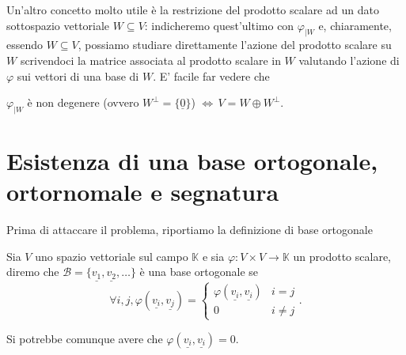 Un'altro concetto molto utile è la restrizione del prodotto scalare ad un dato sottospazio vettoriale $W \subseteq V$: indicheremo quest'ultimo con $\varphi_{|W}$ e, chiaramente, essendo $W \subseteq V$, possiamo studiare direttamente l'azione del prodotto scalare su $W$ scrivendoci la matrice associata al prodotto scalare in $W$ valutando l'azione di $\varphi$ sui vettori di una base di $W$. E' facile far vedere che
\begin{exercise} \label{ex:3.4}
	$\varphi_{|W}$ è non degenere (ovvero $W^\perp = \{ \underline{0} \}$) $\iff \, V = W \oplus W^\perp$.
\end{exercise}

\section{Esistenza di una base ortogonale, ortornomale e segnatura}

Prima di attaccare il problema, riportiamo la definizione di base ortogonale
\begin{definition}
	Sia $V$ uno spazio vettoriale sul campo $\mathbb{K}$ e sia $\varphi: V \times V \to \mathbb{K}$ un prodotto scalare, diremo che $\mathcal{B} = \{ \underline{v_1}, \underline{v_2}, \ldots \}$ è una base ortogonale se
	$$
		\forall i, j, \varphi(\underline{v_i}, \underline{v_j}) = \begin{cases}
			\varphi(\underline{v_i}, \underline{v_i}) & i = j \\
			0 & i \neq j
		\end{cases}.
	$$
\end{definition}
\begin{remark}
	Si potrebbe comunque avere che $\varphi(\underline{v_i}, \underline{v_i}) = 0$.
\end{remark}


